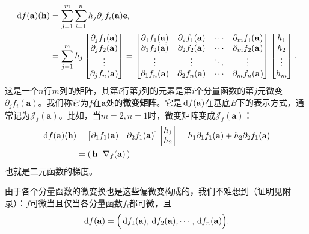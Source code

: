 \documentclass[12pt,UTF8]{ctexbook}
\begin{document}
\begin{align*}
    \,\mathrm{d} f (\mathbf{a})(\mathbf{h}) &= \sum_{j=1}^m \sum_{i=1}^n h_j\partial_{j} f_i(\mathbf{a})\mathbf{e}_i \\
  &= \sum_{j=1}^m h_j\begin{bmatrix}
    \partial_{j} f_1(\mathbf{a}) \\ \partial_{j} f_2(\mathbf{a}) \\ \vdots \\ \partial_{j} f_n(\mathbf{a})
\end{bmatrix} = \begin{bmatrix}
    \partial_{1} f_1(\mathbf{a}) & \partial_{2} f_1(\mathbf{a}) & \cdots & \partial_{m} f_1(\mathbf{a}) \\
    \partial_{1} f_2(\mathbf{a}) & \partial_{2} f_2(\mathbf{a}) & \cdots & \partial_{m} f_2(\mathbf{a}) \\
    \vdots & \vdots & \ddots & \vdots \\
    \partial_{1} f_n(\mathbf{a}) & \partial_{2} f_n(\mathbf{a}) & \cdots & \partial_{m} f_n(\mathbf{a})
\end{bmatrix} \begin{bmatrix}
    h_1 \\ h_2 \\ \vdots \\ h_m
\end{bmatrix}.
\end{align*}
这是一个$n$行$m$列的矩阵，其第$i$行第$j$列的元素是第$i$个分量函数的第$j$元微变$\partial_{j} f_i(\mathbf{a})$。我们称它为$f$在$\mathbf{a}$处的\textbf{微变矩阵}。它是$\,\mathrm{d} f (\mathbf{a})$在基底$B$下的表示方式，通常记为$\mathcal{J}_f(\mathbf{a})$。比如，当$m=2,n=1$时，微变矩阵变成$\mathcal{J}_f(\mathbf{a})$：
\begin{align*}
    \,\mathrm{d} f (\mathbf{a})(\mathbf{h}) &= \begin{bmatrix}
        \partial_{1} f_1(\mathbf{a}) & \partial_{2} f_1(\mathbf{a})
    \end{bmatrix} \begin{bmatrix}
        h_1 \\h_2
    \end{bmatrix} = h_1 \partial_{1} f_1(\mathbf{a}) + h_2 \partial_{2} f_1(\mathbf{a})\\
    &= \displaystyle\left( \,\mathbf{h} \,\middle\vert \,\nabla_f(\mathbf{a}) \,\right)
\end{align*}
也就是二元函数的梯度。

由于各个分量函数的微变换也是这些偏微变构成的，我们不难想到（证明见附录）：$f$可微当且仅当各分量函数$f_i$都可微，且
$$\,\mathrm{d} f (\mathbf{a}) = \Big(\,\mathrm{d} f_1 (\mathbf{a}), \,\mathrm{d} f_2 (\mathbf{a}), \cdots, \,\mathrm{d} f_n (\mathbf{a})\Big).$$
\end{document}
